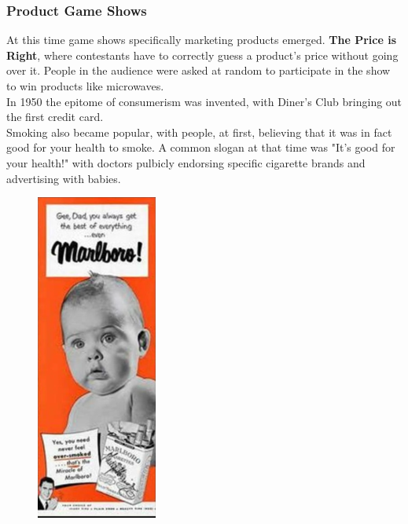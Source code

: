 \documentclass{article}
\begin{document}
	\subsubsection{Product Game Shows}
	At this time game shows specifically marketing products emerged. \textbf{The Price is Right}, where contestants have to correctly guess a product's price without going over it. People in the audience were asked at random to participate in the show to win products like microwaves. \\
	In 1950 the epitome of consumerism was invented, with Diner's Club bringing out the first credit card. \\
	Smoking also became popular, with people, at first, believing that it was in fact good for your health to smoke. A common slogan at that time was "It's good for your health!" with doctors pulbicly endorsing specific cigarette brands and advertising with babies. \\
	\begin{figure}[H]
	\centering
	\includegraphics{images/Smoking_SM.png}
	\end{figure}
	
\end{document}
